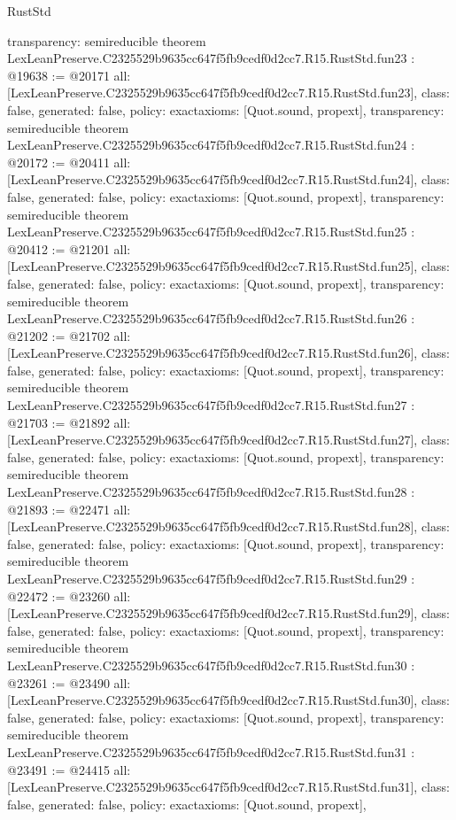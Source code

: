 \begin{lexlean}{RustStd}
\begin{coremodule}
{  transparency: semireducible
}
theorem LexLeanPreserve.C2325529b9635cc647f5fb9cedf0d2cc7.R15.RustStd.fun23 : @19638 := @20171 {
  all: [LexLeanPreserve.C2325529b9635cc647f5fb9cedf0d2cc7.R15.RustStd.fun23],
  class: false,
  generated: false,
  policy: exact{axioms: [Quot.sound, propext]},
  transparency: semireducible
}
theorem LexLeanPreserve.C2325529b9635cc647f5fb9cedf0d2cc7.R15.RustStd.fun24 : @20172 := @20411 {
  all: [LexLeanPreserve.C2325529b9635cc647f5fb9cedf0d2cc7.R15.RustStd.fun24],
  class: false,
  generated: false,
  policy: exact{axioms: [Quot.sound, propext]},
  transparency: semireducible
}
theorem LexLeanPreserve.C2325529b9635cc647f5fb9cedf0d2cc7.R15.RustStd.fun25 : @20412 := @21201 {
  all: [LexLeanPreserve.C2325529b9635cc647f5fb9cedf0d2cc7.R15.RustStd.fun25],
  class: false,
  generated: false,
  policy: exact{axioms: [Quot.sound, propext]},
  transparency: semireducible
}
theorem LexLeanPreserve.C2325529b9635cc647f5fb9cedf0d2cc7.R15.RustStd.fun26 : @21202 := @21702 {
  all: [LexLeanPreserve.C2325529b9635cc647f5fb9cedf0d2cc7.R15.RustStd.fun26],
  class: false,
  generated: false,
  policy: exact{axioms: [Quot.sound, propext]},
  transparency: semireducible
}
theorem LexLeanPreserve.C2325529b9635cc647f5fb9cedf0d2cc7.R15.RustStd.fun27 : @21703 := @21892 {
  all: [LexLeanPreserve.C2325529b9635cc647f5fb9cedf0d2cc7.R15.RustStd.fun27],
  class: false,
  generated: false,
  policy: exact{axioms: [Quot.sound, propext]},
  transparency: semireducible
}
theorem LexLeanPreserve.C2325529b9635cc647f5fb9cedf0d2cc7.R15.RustStd.fun28 : @21893 := @22471 {
  all: [LexLeanPreserve.C2325529b9635cc647f5fb9cedf0d2cc7.R15.RustStd.fun28],
  class: false,
  generated: false,
  policy: exact{axioms: [Quot.sound, propext]},
  transparency: semireducible
}
theorem LexLeanPreserve.C2325529b9635cc647f5fb9cedf0d2cc7.R15.RustStd.fun29 : @22472 := @23260 {
  all: [LexLeanPreserve.C2325529b9635cc647f5fb9cedf0d2cc7.R15.RustStd.fun29],
  class: false,
  generated: false,
  policy: exact{axioms: [Quot.sound, propext]},
  transparency: semireducible
}
theorem LexLeanPreserve.C2325529b9635cc647f5fb9cedf0d2cc7.R15.RustStd.fun30 : @23261 := @23490 {
  all: [LexLeanPreserve.C2325529b9635cc647f5fb9cedf0d2cc7.R15.RustStd.fun30],
  class: false,
  generated: false,
  policy: exact{axioms: [Quot.sound, propext]},
  transparency: semireducible
}
theorem LexLeanPreserve.C2325529b9635cc647f5fb9cedf0d2cc7.R15.RustStd.fun31 : @23491 := @24415 {
  all: [LexLeanPreserve.C2325529b9635cc647f5fb9cedf0d2cc7.R15.RustStd.fun31],
  class: false,
  generated: false,
  policy: exact{axioms: [Quot.sound, propext]},
}
\end{coremodule}
\end{lexlean}
